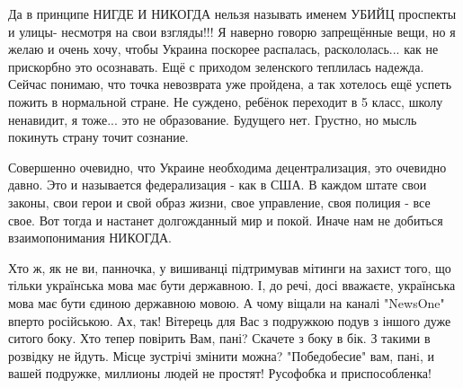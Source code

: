 \begin{itemize}
Да в принципе НИГДЕ И НИКОГДА нельзя называть именем УБИЙЦ проспекты и улицы-
несмотря на свои взгляды!!!
Я наверно говорю запрещённые вещи, но я желаю и очень хочу, чтобы Украина
поскорее распалась, раскололась... как не прискорбно это осознавать. Ещё с
приходом зеленского теплилась надежда. Сейчас понимаю, что точка невозврата уже
пройдена, а так хотелось ещё успеть пожить в нормальной стране. Не суждено,
ребёнок переходит в 5 класс, школу ненавидит, я тоже... это не образование.
Будущего нет. Грустно, но мысль покинуть страну точит сознание.

Совершенно очевидно, что Украине необходима децентрализация, это очевидно
давно. Это и называется федерализация - как в США. В каждом штате свои законы,
свои герои и свой образ жизни, свое управление, своя полиция - все свое. Вот
тогда и настанет долгожданный мир и покой. Иначе нам не добиться
взаимопонимания НИКОГДА.


Хто ж, як не ви, панночка, у вишиванці підтримував мітинги на захист того, що
тільки українська мова має бути державною. І, до речі, досі вважаєте,
українська мова має бути єдиною державною мовою. А чому віщали на каналі
"NewsOne" вперто російською. Ах, так! Вітерець для Вас з подружкою подув з
іншого дуже ситого боку. Хто тепер повірить Вам, пані? Скачете з боку в бік. З
такими в розвідку не йдуть. Місце зустрічі змінити можна?
"Победобесие" вам, панi, и вашей подружке, миллионы людей не простят! Русофобка
и приспособленка!



\end{itemize}
